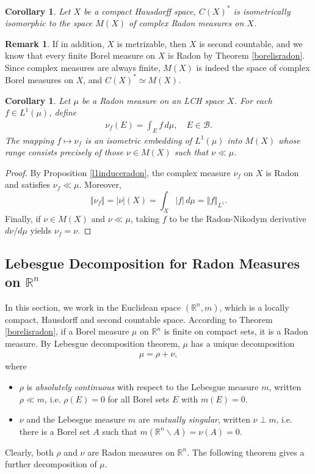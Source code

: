 \documentclass{article}
\numberwithin{equation}{section}
\newcommand{\bbR}{\mathbb{R}}
\theoremstyle{plain}
\newtheorem{corollary}[theorem]{Corollary}
\theoremstyle{definition}
\newtheorem*{remark}{Remark}
\begin{document}
\begin{corollary}\label{chsradon}
	Let $X$ be a compact Hausdorff space, $C(X)^*$ is isometrically isomorphic to the space $M(X)$ of complex Radon measures on $X$.
\end{corollary}
\begin{remark}
	If in addition, $X$ is metrizable, then $X$ is second countable, and we know that every finite Borel measure on $X$ is Radon by Theorem \ref{borelisradon}. Since complex measures are always finite, $M(X)$ is indeed the space of complex Borel measures on $X$, and $C(X)^*\simeq M(X)$.
\end{remark}
\begin{corollary}
	Let $\mu$ be a Radon measure on an LCH space $X$. For each $f\in L^1(\mu)$, define
	\begin{align*}
		\nu_f(E)=\int_E f\,d\mu,\quad E\in\mathscr{B}.
	\end{align*} 
	The mapping $f\mapsto\nu_f$ is an isometric embedding of $L^1(\mu)$ into $M(X)$ whose range consists precisely of those $\nu\in M(X)$ such that $\nu\ll\mu$.
\end{corollary}
\begin{proof}
	By Proposition \ref{l1induceradon}, the complex measure $\nu_f$ on $X$ is Radon and satisfies $\nu_f\ll\mu$. Moreover, $$\Vert\nu_f\Vert=\vert\nu\vert(X)=\int_X\vert f\vert\,d\mu=\Vert f\Vert_{L^1}.$$
	Finally, if $\nu\in M(X)$ and $\nu\ll\mu$, taking $f$ to be the Radon-Nikodym derivative $d\nu/d\mu$ yields $\nu_f=\nu$.
\end{proof}

\newpage
\subsection{Lebesgue Decomposition for Radon Measures on $\bbR^n$}
In this section, we work in the Euclidean space $(\bbR^n,m)$, which is a locally compact, Hausdorff and second countable space. According to Theorem \ref{borelisradon}, if a Borel measure $\mu$ on $\bbR^n$ is finite on compact sets, it is a Radon measure. By Lebesgue decomposition theorem, $\mu$ has a unique decomposition
\begin{align*}
	\mu=\rho+\nu,
\end{align*}
where
\begin{itemize}
	\item $\rho$ is \textit{absolutely continuous} with respect to the Lebesgue measure $m$, written $\rho\ll m$, i.e. $\rho(E)=0$ for all Borel sets $E$ with $m(E)=0$.
	\item $\nu$ and the Lebesgue measure $m$ are \textit{mutually singular}, written $\nu\perp m$, i.e. there is a Borel set $A$ such that $m(\bbR^n\backslash A)=\nu(A)=0$.
\end{itemize}
Clearly, both $\rho$ and $\nu$ are Radon measures on $\bbR^n$. The following theorem gives a further decomposition of $\mu$.
\end{document}
